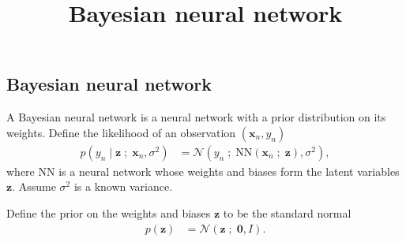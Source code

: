 \title{Bayesian neural network}

\subsection{Bayesian neural network}

A Bayesian neural network is a neural network with a prior
distribution on its weights.
Define the likelihood of an observation $(\mathbf{x}_n, y_n)$
\begin{align*}
  p(y_n \mid \mathbf{z} \;;\; \mathbf{x}_n, \sigma^2)
  &=
  \mathcal{N}(y_n \;;\; \mathrm{NN}(\mathbf{x}_n\;;\;\mathbf{z}), \sigma^2),
\end{align*}
where $\mathrm{NN}$ is a neural network whose weights and biases form
the latent variables $\mathbf{z}$. Assume $\sigma^2$ is a
known variance.

Define the prior on the weights and biases $\mathbf{z}$ to be the standard normal
\begin{align*}
  p(\mathbf{z})
  &=
  \mathcal{N}(\mathbf{z} \;;\; \mathbf{0}, I).
\end{align*}


